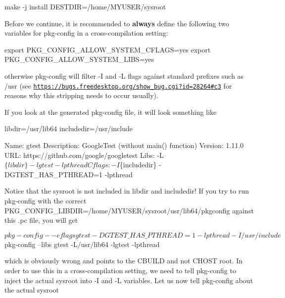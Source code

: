 \begin{DoxyCode}
make -j install DESTDIR=/home/MYUSER/sysroot
\end{DoxyCode}


Before we continue, it is recommended to {\bfseries always} define the following two variables for pkg-\/config in a cross-\/compilation setting\+:


\begin{DoxyCode}
export PKG\_CONFIG\_ALLOW\_SYSTEM\_CFLAGS=yes
export PKG\_CONFIG\_ALLOW\_SYSTEM\_LIBS=yes
\end{DoxyCode}


otherwise {\ttfamily pkg-\/config} will filter {\ttfamily -\/I} and {\ttfamily -\/L} flags against standard prefixes such as {\ttfamily /usr} (see \href{https://bugs.freedesktop.org/show_bug.cgi?id=28264#c3}{\tt https\+://bugs.\+freedesktop.\+org/show\+\_\+bug.\+cgi?id=28264\#c3} for reasons why this stripping needs to occur usually).

If you look at the generated pkg-\/config file, it will look something like


\begin{DoxyCode}
libdir=/usr/lib64
includedir=/usr/include

Name: gtest
Description: GoogleTest (without main() function)
Version: 1.11.0
URL: https://github.com/google/googletest
Libs: -L$\{libdir\} -lgtest -lpthread
Cflags: -I$\{includedir\} -DGTEST\_HAS\_PTHREAD=1 -lpthread
\end{DoxyCode}


Notice that the sysroot is not included in {\ttfamily libdir} and {\ttfamily includedir}! If you try to run {\ttfamily pkg-\/config} with the correct {\ttfamily P\+K\+G\+\_\+\+C\+O\+N\+F\+I\+G\+\_\+\+L\+I\+B\+D\+IR=/home/\+M\+Y\+U\+S\+E\+R/sysroot/usr/lib64/pkgconfig} against this {\ttfamily .pc} file, you will get


\begin{DoxyCode}
$ pkg-config --cflags gtest
-DGTEST\_HAS\_PTHREAD=1 -lpthread -I/usr/include
$ pkg-config --libs gtest
-L/usr/lib64 -lgtest -lpthread
\end{DoxyCode}


which is obviously wrong and points to the {\ttfamily C\+B\+U\+I\+LD} and not {\ttfamily C\+H\+O\+ST} root. In order to use this in a cross-\/compilation setting, we need to tell pkg-\/config to inject the actual sysroot into {\ttfamily -\/I} and {\ttfamily -\/L} variables. Let us now tell pkg-\/config about the actual sysroot


